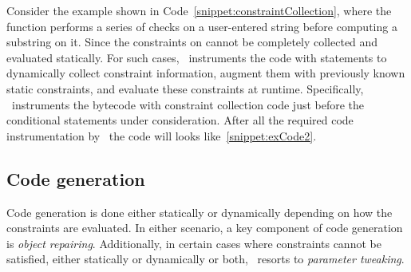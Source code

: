 \begin{mylist}
Consider the example shown in Code~\ref{snippet:constraintCollection}, where the function
 performs a series of checks on a user-entered string  before computing
a substring on it. Since the constraints on  cannot be
completely collected and evaluated statically. For such cases, \tool\
instruments the code with statements to dynamically collect constraint
information, augment them with previously known static constraints, and evaluate
these constraints at runtime. Specifically, \tool\ instruments the bytecode
with constraint collection code just before the conditional statements under
consideration. After all the required code instrumentation by \tool\ the code
will looks like~\ref{snippet:exCode2}.

\end{mylist}

\subsection{Code generation}
\label{sec:tool:stage2:generation}

Code generation is done either statically or dynamically depending on how
the constraints are evaluated. In either scenario, a key component of code
generation is \textit{object repairing}. Additionally, in certain cases
where constraints cannot be satisfied, either statically or dynamically or
both, \tool\ resorts to \textit{parameter tweaking}.

